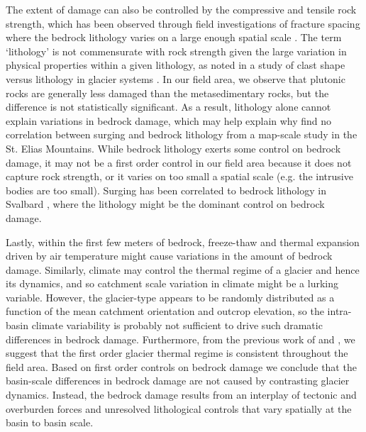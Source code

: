 \documentclass[review]{igs}
\begin{document}
The extent of damage can also be controlled by the compressive and tensile rock strength, which has been observed through field investigations of fracture spacing where the bedrock lithology varies on a large enough spatial scale \citep[e.g.][]{Sturzenegger2007}. The term `lithology' is not commensurate with rock strength given the large variation in physical properties within a given lithology, as noted in a study of clast shape versus lithology in glacier systems \citep{Lukas2013}. In our field area, we observe that plutonic rocks are generally less damaged than the metasedimentary rocks, but the difference is not statistically significant. As a result, lithology alone cannot explain variations in bedrock damage, which may help explain why \cite{Clarke1986} find no correlation between surging and bedrock lithology from a map-scale study in the St. Elias Mountains. While bedrock lithology exerts some control on bedrock damage, it may not be a first order control in our field area because it does not capture rock strength, or it varies on too small a spatial scale (e.g. the intrusive bodies are too small). Surging has been correlated to bedrock lithology in Svalbard \citep{Hamilton1996,Jiskoot1998}, where the lithology might be the dominant control on bedrock damage.

Lastly, within the first few meters of bedrock, freeze-thaw and thermal expansion driven by air temperature might cause variations in the amount of bedrock damage. Similarly, climate may control the thermal regime of a glacier and hence its dynamics, and so catchment scale variation in climate might be a lurking variable. However, the glacier-type appears to be randomly distributed as a function of the mean catchment orientation and outcrop elevation, so the intra-basin climate variability is probably not sufficient to drive such dramatic differences in bedrock damage. Furthermore, from the previous work of \cite{Wilson2013a} and \cite{Wilson2013}, we suggest that the first order glacier thermal regime is consistent throughout the field area. Based on first order controls on bedrock damage we conclude that the basin-scale differences in bedrock damage are not caused by contrasting glacier dynamics. Instead, the bedrock damage results from an interplay of tectonic and overburden forces and unresolved lithological controls that vary spatially at the basin to basin scale. 

\end{document}
